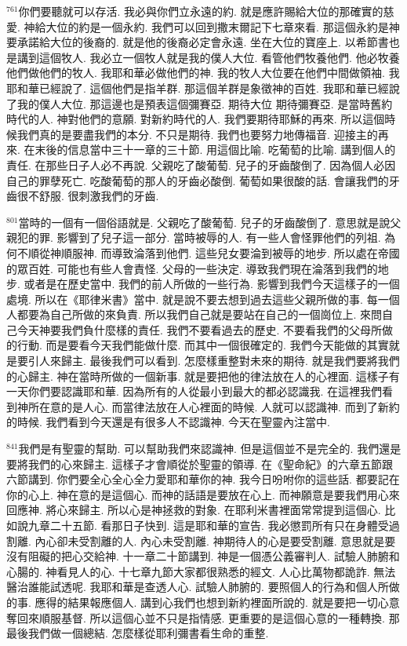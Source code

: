 \documentclass{book}
\begin{document}
$^{761}$你們要聽就可以存活.
我必與你們立永遠的約.
就是應許賜給大位的那確實的慈愛.
神給大位的約是一個永約.
我們可以回到撒末爾記下七章來看.
那這個永約是神要承諾給大位的後裔的.
就是他的後裔必定會永遠.
坐在大位的寶座上.
以希節書也是講到這個牧人.
我必立一個牧人就是我的僕人大位.
看管他們牧養他們.
他必牧養他們做他們的牧人.
我耶和華必做他們的神.
我的牧人大位要在他們中間做領袖.
我耶和華已經說了.
這個他們是指羊群.
那這個羊群是象徵神的百姓.
我耶和華已經說了我的僕人大位.
那這邊也是預表這個彌賽亞.
期待大位 期待彌賽亞.
是當時舊約時代的人.
神對他們的意願.
對新約時代的人.
我們要期待耶穌的再來.
所以這個時候我們真的是要盡我們的本分.
不只是期待.
我們也要努力地傳福音.
迎接主的再來.
在末後的信息當中三十一章的三十節.
用這個比喻.
吃葡萄的比喻.
講到個人的責任.
在那些日子人必不再說.
父親吃了酸葡萄.
兒子的牙齒酸倒了.
因為個人必因自己的罪孽死亡.
吃酸葡萄的那人的牙齒必酸倒.
葡萄如果很酸的話.
會讓我們的牙齒很不舒服.
很刺激我們的牙齒.

$^{801}$當時的一個有一個俗語就是.
父親吃了酸葡萄.
兒子的牙齒酸倒了.
意思就是說父親犯的罪.
影響到了兒子這一部分.
當時被辱的人.
有一些人會怪罪他們的列祖.
為何不順從神順服神.
而導致淪落到他們.
這些兒女要淪到被辱的地步.
所以處在帝國的眾百姓.
可能也有些人會責怪.
父母的一些決定.
導致我們現在淪落到我們的地步.
或者是在歷史當中.
我們的前人所做的一些行為.
影響到我們今天這樣子的一個處境.
所以在《耶律米書》當中.
就是說不要去想到過去這些父親所做的事.
每一個人都要為自己所做的來負責.
所以我們自己就是要站在自己的一個崗位上.
來問自己今天神要我們負什麼樣的責任.
我們不要看過去的歷史.
不要看我們的父母所做的行動.
而是要看今天我們能做什麼.
而其中一個很確定的.
我們今天能做的其實就是要引人來歸主.
最後我們可以看到.
怎麼樣重整對未來的期待.
就是我們要將我們的心歸主.
神在當時所做的一個新事.
就是要把他的律法放在人的心裡面.
這樣子有一天你們要認識耶和華.
因為所有的人從最小到最大的都必認識我.
在這裡我們看到神所在意的是人心.
而當律法放在人心裡面的時候.
人就可以認識神.
而到了新約的時候.
我們看到今天還是有很多人不認識神.
今天在聖靈內注當中.

$^{841}$我們是有聖靈的幫助.
可以幫助我們來認識神.
但是這個並不是完全的.
我們還是要將我們的心來歸主.
這樣子才會順從於聖靈的領導.
在《聖命紀》的六章五節跟六節講到.
你們要全心全心全力愛耶和華你的神.
我今日吩咐你的這些話.
都要記在你的心上.
神在意的是這個心.
而神的話語是要放在心上.
而神願意是要我們用心來回應神.
將心來歸主.
所以心是神拯救的對象.
在耶利米書裡面常常提到這個心.
比如說九章二十五節.
看那日子快到.
這是耶和華的宣告.
我必懲罰所有只在身體受過割離.
內心卻未受割離的人.
內心未受割離.
神期待人的心是要受割離.
意思就是要沒有阻礙的把心交給神.
十一章二十節講到.
神是一個憑公義審判人.
試驗人肺腑和心腸的.
神看見人的心.
十七章九節大家都很熟悉的經文.
人心比萬物都詭詐.
無法醫治誰能試透呢.
我耶和華是查透人心.
試驗人肺腑的.
要照個人的行為和個人所做的事.
應得的結果報應個人.
講到心我們也想到新約裡面所說的.
就是要把一切心意奪回來順服基督.
所以這個心並不只是指情感.
更重要的是這個心意的一種轉換.
那最後我們做一個總結.
怎麼樣從耶利彌書看生命的重整.
\end{document}
